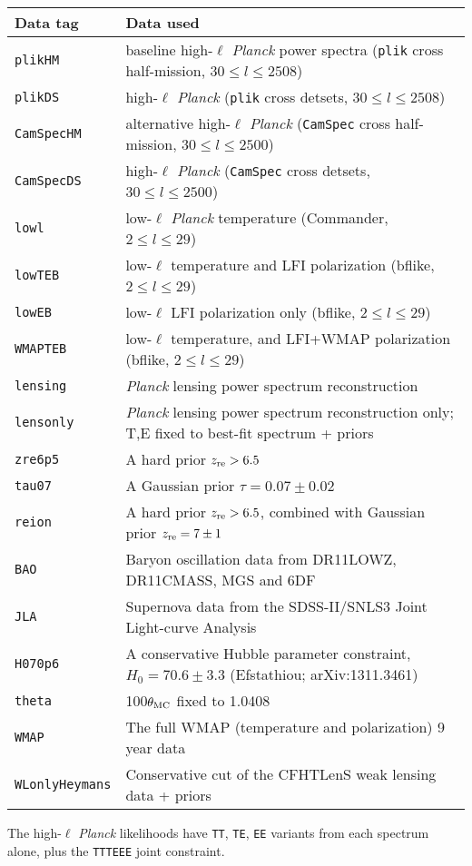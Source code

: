 \begin{tabular} { l   l  }
Data tag & Data used\\
\hline
{\tt plikHM}         & baseline high-$\ell$ \textit{Planck} power spectra ({\tt plik} cross half-mission, $30\le l\le 2508$) \\
{\tt plikDS}         & high-$\ell$ \textit{Planck} ({\tt plik} cross detsets, $30\le l\le 2508$) \\
{\tt CamSpecHM}      & alternative high-$\ell$ \textit{Planck}  ({\tt CamSpec} cross half-mission, $30\le l\le 2500$) \\
{\tt CamSpecDS}      & high-$\ell$ \textit{Planck} ({\tt CamSpec} cross detsets, $30\le l\le 2500$) \\
{\tt lowl }          & low-$\ell$ \textit{Planck} temperature (Commander, $2\le l \le 29$)  \\
{\tt lowTEB}         & low-$\ell$ temperature and LFI polarization (bflike, $2\le l \le 29$)\\
{\tt lowEB}          & low-$\ell$  LFI polarization only (bflike, $2\le l \le 29$)\\
{\tt WMAPTEB}        & low-$\ell$ temperature, and  LFI+WMAP polarization (bflike, $2\le l \le 29$)\\
{\tt lensing}        & \textit{Planck}  lensing power spectrum reconstruction\\
{\tt lensonly}       & \textit{Planck}  lensing power spectrum reconstruction only; T,E fixed to best-fit spectrum + priors\\
{\tt zre6p5}         & A hard prior $z_{\rm re} > 6.5$\\
{\tt tau07}          & A Gaussian prior $\tau = 0.07 \pm 0.02$\\
{\tt reion}          & A hard prior $z_{\rm re} > 6.5$, combined with Gaussian prior $z_{\rm re} = 7\pm 1$\\
{\tt BAO}            & Baryon oscillation data from DR11LOWZ, DR11CMASS, MGS and 6DF \\
{\tt JLA}            & Supernova data from the SDSS-II/SNLS3 Joint Light-curve Analysis \\
{\tt H070p6}         & A conservative Hubble parameter constraint, $H_0 = 70.6\pm 3.3$ (Efstathiou; arXiv:1311.3461) \\
{\tt theta}          & 100$\theta_{\rm MC}$ fixed to 1.0408 \\
{\tt WMAP}           & The full WMAP (temperature and polarization) 9 year data \\
{\tt WLonlyHeymans}      & Conservative cut of the CFHTLenS weak lensing data + priors \\
\hline
\end{tabular}
\vskip 1cm
The high-$\ell$ \textit{Planck} likelihoods have {\tt TT}, {\tt TE}, {\tt EE} variants from each spectrum alone, plus the {\tt TTTEEE} joint constraint.

